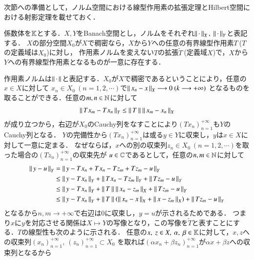 
次節への準備として，ノルム空間における線型作用素の拡張定理とHilbert空間における射影定理を載せておく．
\begin{itembox}[l]{}
	\begin{thm}[線型作用素の拡張]
		係数体を$\mathbb{K}$とする．$X,Y$をBanach空間とし，ノルムをそれぞれ$\Norm{\cdot}{X},\ \Norm{\cdot}{Y}$と表記する．
		$X$の部分空間$X_0$が$X$で稠密なら，$X$から$Y$への任意の有界線型作用素$T\ $($T$の定義域は$X_0$)に対し，
		作用素ノルムを変えない$T$の拡張$\tilde{T}\ $(定義域$X$)で，$X$から$Y$への有界線型作用素となるものが一意に存在する．
	\end{thm}
\end{itembox}
\begin{prf}
		作用素ノルムは$\left\|\, \cdot\, \right\|_{}$と表記する．$X_0$が$X$で稠密であるということにより，任意の$x \in X$に対して
		$x_n \in X_0 \ (n=1,2,\cdots)$で$\left\|\, x_n - x\, \right\|_{X} \longrightarrow 0\ (k \longrightarrow +\infty)$
		となるものを取ることができる．任意の$m,n \in \mathbb{N}$に対して
		\begin{align}
			\left\|\, Tx_m - Tx_n\, \right\|_{Y} \leq \left\|\, T\, \right\|_{} \left\|\, x_m - x_n\, \right\|_{X}
		\end{align}
		が成り立つから，右辺が$X_0$のCauchy列をなすことにより$(Tx_n)_{n=1}^{+\infty}$も$Y$のCauchy列となる．
		$Y$の完備性から$(Tx_n)_{n=1}^{+\infty}$は或る$y \in Y$に収束し，$y$は$x \in X$に対して一意に定まる．
		なぜならば，$x$への別の収束列$z_n \in X_0 \ (n=1,2,\cdots)$を取った場合の$(Tz_n)_{n=1}^{+\infty}$の収束先が
		$u \in \mathbb{C}$であるとして，任意の$n,m \in \mathbb{N}$に対して
		\begin{align}
			\left\|\, y - u\, \right\|_{Y} &= \left\|\, y - Tx_n + Tx_n - Tz_m + Tz_m - u\, \right\|_{Y} \\
			&\leq \left\|\, y - Tx_n\, \right\|_{Y} + \left\|\, Tx_n - Tz_m\, \right\|_{Y} + \left\|\, Tz_m - u\, \right\|_{Y} \\
			&\leq \left\|\, y - Tx_n\, \right\|_{Y} + \left\|\, T\, \right\|_{}\left\|\, x_n - z_m\, \right\|_{X} + \left\|\, Tz_m - u\, \right\|_{Y} \\
			&\leq \left\|\, y - Tx_n\, \right\|_{Y} + \left\|\, T\, \right\|_{}\left(\left\|\, x_n - x\, \right\|_{X} + \left\|\, x - z_m\, \right\|_{X}\right)+ \left\|\, Tz_m - u\, \right\|_{Y}
		\end{align}
		となるから$n,m \longrightarrow +\infty$で右辺は0に収束し，$y = u$が示されるためである．
		つまり$x$に$y$を対応させる関係は$X \longmapsto Y$の写像となり，この写像を$\tilde{T}$と表すことにする．$T$の線型性も次のように示される．
		任意の$x,\ z \in X,\ \alpha,\ \beta \in \mathbb{K}$に対して，$x,z$への収束列$(x_n)_{n=1}^{+\infty},\ (z_n)_{n=1}^{+\infty} \subset X_0$
		を取れば$(\alpha x_n + \beta z_n)_{n=1}^{+\infty}$が$\alpha x+ \beta z$への収束列となるから
		\begin{align}

\end{align}
\end{prf}
